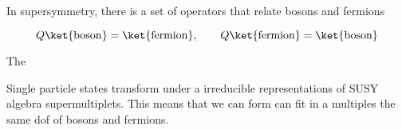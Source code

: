 In supersymmetry, there is a set of operators that relate bosons and fermions

\begin{equation}
  Q\ket{\mathrm{boson}}=\ket{\mathrm{fermion}}, \qquad
  Q\ket{\mathrm{fermion}}=\ket{\mathrm{boson}}
\end{equation}

The 


Single particle states transform under a irreducible representations of SUSY algebra supermultiplets.
This means that we can form can fit in a multiples the same dof of bosons and fermions.
